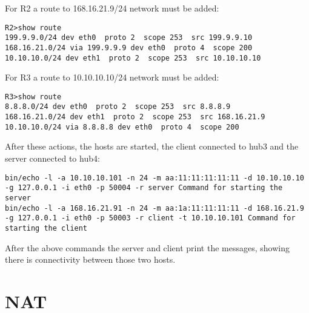 {{For R2 a route to 168.16.21.9/24 network must be added:
\lstset{language=TeX, caption=R2 routing table}
\begin{lstlisting}
R2>show route  
199.9.9.0/24 dev eth0  proto 2  scope 253  src 199.9.9.10 
168.16.21.0/24 via 199.9.9.9 dev eth0  proto 4  scope 200 
10.10.10.0/24 dev eth1  proto 2  scope 253  src 10.10.10.10
\end{lstlisting}

For R3 a route to 10.10.10.10/24 network must be added:
\lstset{language=TeX, caption=R3 routing table}
\begin{lstlisting}
R3>show route  
8.8.8.0/24 dev eth0  proto 2  scope 253  src 8.8.8.9 
168.16.21.0/24 dev eth1  proto 2  scope 253  src 168.16.21.9 
10.10.10.0/24 via 8.8.8.8 dev eth0  proto 4  scope 200
\end{lstlisting}

After these actions, the hosts are started, the client connected to hub3 and the server connected to hub4:
\lstset{language=TeX, caption=Commands issued for starting client and server}
\begin{lstlisting}
bin/echo -l -a 10.10.10.101 -n 24 -m aa:11:11:11:11:11 -d 10.10.10.10 -g 127.0.0.1 -i eth0 -p 50004 -r server Command for starting the server
bin/echo -l -a 168.16.21.91 -n 24 -m aa:1a:11:11:11:11 -d 168.16.21.9 -g 127.0.0.1 -i eth0 -p 50003 -r client -t 10.10.10.101 Command for starting the client
\end{lstlisting}
After the above commands the server and client print the messages, showing there is connectivity between those two hosts.
\section{NAT}
\label{sub-sec:nat-impl}

}}
